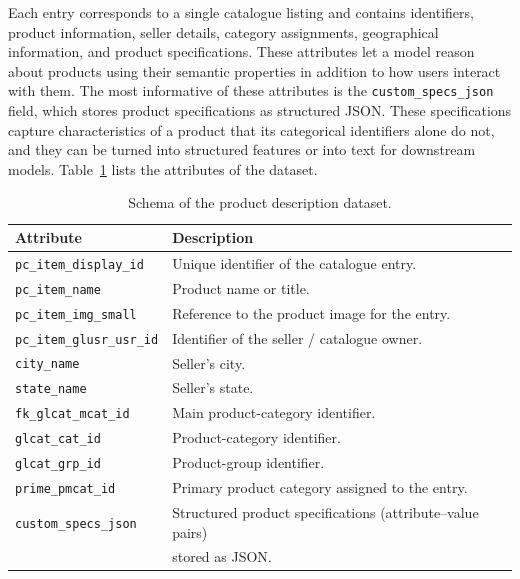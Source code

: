Each entry corresponds to a single catalogue listing and contains identifiers,
product information, seller details, category assignments, geographical
information, and product specifications. These attributes let a model reason
about products using their semantic properties in addition to how users interact
with them. The most informative of these attributes is the
\texttt{custom\_specs\_json} field, which stores product specifications as
structured JSON. These specifications capture characteristics of a product that
its categorical identifiers alone do not, and they can be turned into structured
features or into text for downstream models. Table~\ref{tab:product-schema}
lists the attributes of the dataset.

\begin{table}[ht]
  \centering
  \caption{Schema of the product description dataset.}
  \label{tab:product-schema}
  \begin{tabular}{ll}
    \toprule
    Attribute & Description \\
    \midrule
    \texttt{pc\_item\_display\_id}   & Unique identifier of the catalogue entry. \\
    \texttt{pc\_item\_name}          & Product name or title. \\
    \texttt{pc\_item\_img\_small}    & Reference to the product image for the entry. \\
    \texttt{pc\_item\_glusr\_usr\_id}& Identifier of the seller / catalogue owner. \\
    \texttt{city\_name}              & Seller's city. \\
    \texttt{state\_name}             & Seller's state. \\
    \texttt{fk\_glcat\_mcat\_id}     & Main product-category identifier. \\
    \texttt{glcat\_cat\_id}          & Product-category identifier. \\
    \texttt{glcat\_grp\_id}          & Product-group identifier. \\
    \texttt{prime\_pmcat\_id}        & Primary product category assigned to the entry. \\
    \texttt{custom\_specs\_json}     & Structured product specifications (attribute--value pairs) \\
                                     & stored as JSON. \\
    \bottomrule
  \end{tabular}
\end{table}

